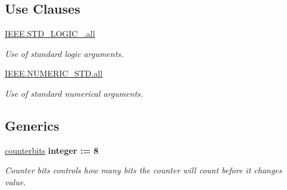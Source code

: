 \subsection*{Use Clauses}
 \begin{DoxyCompactItemize}
\item 
\hypertarget{classbounce__filter_a68c233289eaf7d2601307bdd93b4c299}{\hyperlink{classbounce__filter_a68c233289eaf7d2601307bdd93b4c299}{I\-E\-E\-E.\-S\-T\-D\-\_\-\-L\-O\-G\-I\-C\-\_.\-all}   }\label{classbounce__filter_a68c233289eaf7d2601307bdd93b4c299}

\begin{DoxyCompactList}\small\item\em Use of standard logic arguments. \end{DoxyCompactList}\item 
\hypertarget{classbounce__filter_a7c135c43c66ccd7f22abe5f6211788a5}{\hyperlink{classbounce__filter_a7c135c43c66ccd7f22abe5f6211788a5}{I\-E\-E\-E.\-N\-U\-M\-E\-R\-I\-C\-\_\-\-S\-T\-D.\-all}   }\label{classbounce__filter_a7c135c43c66ccd7f22abe5f6211788a5}

\begin{DoxyCompactList}\small\item\em Use of standard numerical arguments. \end{DoxyCompactList}\end{DoxyCompactItemize}
\subsection*{Generics}
 \begin{DoxyCompactItemize}
\item 
\hypertarget{classbounce__filter_a5df2a2aceb759129bf8abccdc30aec13}{\hyperlink{classbounce__filter_a5df2a2aceb759129bf8abccdc30aec13}{counterbits} {\bfseries {\bfseries \textcolor{comment}{integer}\textcolor{vhdlchar}{ }\textcolor{vhdlchar}{\-:}\textcolor{vhdlchar}{=}\textcolor{vhdlchar}{ } \textcolor{vhdldigit}{8} \textcolor{vhdlchar}{ }}}}\label{classbounce__filter_a5df2a2aceb759129bf8abccdc30aec13}

\begin{DoxyCompactList}\small\item\em Counter bits controls how many bits the counter will count before it changes value. \end{DoxyCompactList}\end{DoxyCompactItemize}
